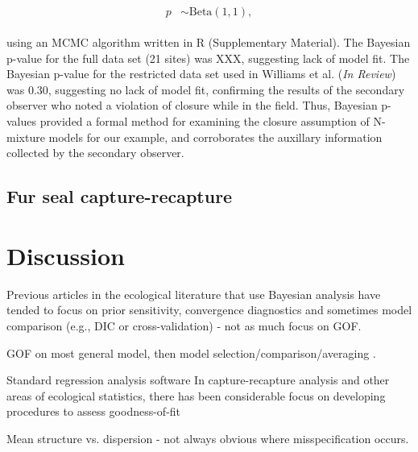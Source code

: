 \documentclass[12pt,english]{article}
\begin{document}
\begin{spacing}{1.9}
\begin{linenomath}
\begin{align}
\begin{split}
          p & \sim \text{Beta}(1,1),
        \end{split}
              \label{eq:nmix2}
      \end{align}
    \end{linenomath}
    using an MCMC algorithm written in R (Supplementary Material). The
    Bayesian p-value for the full data set (21 sites) was XXX,
    suggesting lack of model fit. The Bayesian p-value for the
    restricted data set used in Williams et al. (\emph{In Review}) was
    0.30, suggesting no lack of model fit, confirming the results of
    the secondary observer who noted a violation of closure while in
    the field. Thus, Bayesian p-values provided a formal method for
    examining the closure assumption of N-mixture models for our
    example, and corroborates the auxillary information collected by
    the secondary observer.



    \subsection{Fur seal capture-recapture}

    \section{Discussion}


    Previous articles in the ecological literature that use Bayesian
    analysis have tended to focus on prior sensitivity, convergence
    diagnostics and sometimes model comparison (e.g., DIC or
    cross-validation) - not as much focus on GOF.

    GOF on most general model, then model
    selection/comparison/averaging \citep{BurnhamAnderson2002}.

    Standard regression analysis software In capture-recapture
    analysis and other areas of ecological statistics, there has been
    considerable focus on developing procedures to assess
    goodness-of-fit \citep[e.g.,][]{ChoquetEtAl2009}

    Mean structure vs. dispersion - not always obvious where
    misspecification occurs.


\end{spacing}
\end{document}
